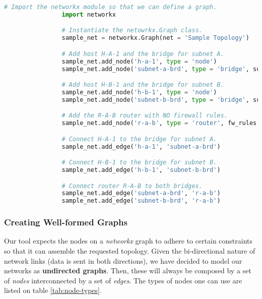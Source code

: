            \begin{lstlisting}[language = python, caption = Defining the Sample Topology as a \textit{networkx} Graph., label = lst:sample-topology-graph]
                # Import the networkx module so that we can define a graph.
                import networkx

                # Instantiate the netowrkx.Graph class.
                sample_net = networkx.Graph(net = 'Sample Topology')

                # Add host H-A-1 and the bridge for subnet A.
                sample_net.add_node('h-a-1', type = 'node')
                sample_net.add_node('subnet-a-brd', type = 'bridge', subnet = '10.0.0.0/24')

                # Add host H-B-1 and the bridge for subnet B.
                sample_net.add_node('h-b-1', type = 'node')
                sample_net.add_node('subnet-b-brd', type = 'bridge', subnet = '10.0.1.0/24')

                # Add the R-A-B router with NO firewall rules.
                sample_net.add_node('r-a-b', type = 'router', fw_rules = {})

                # Connect H-A-1 to the bridge for subnet A.
                sample_net.add_edge('h-a-1', 'subnet-a-brd')

                # Connect H-B-1 to the bridge for subnet B.
                sample_net.add_edge('h-b-1', 'subnet-b-brd')

                # Connect router R-A-B to both bridges.
                sample_net.add_edge('subnet-a-brd', 'r-a-b')
                sample_net.add_edge('subnet-b-brd', 'r-a-b')
            \end{lstlisting}

            \subsubsection{Creating Well-formed Graphs} \label{sec:good-graphs}
                Our tool expects the nodes on a \textit{networkx} graph to adhere to certain constraints so that it can assemble the requested topology. Given the bi-directional nature of network links (data is sent in both directions), we have decided to model our networks as \textbf{undirected graphs}. Then, these will always be composed by a set of \textit{nodes} interconnected by a set of \textit{edges}. The types of nodes one can use are listed on table \ref{tab:node-types}.\\

